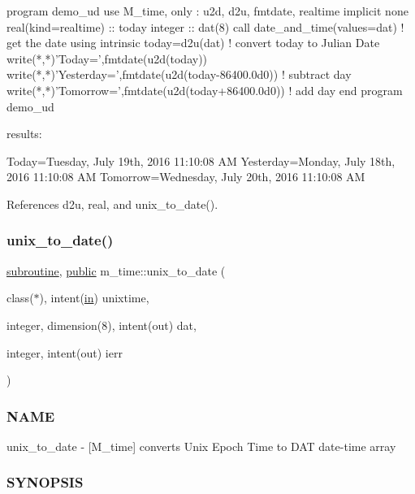 \begin{DoxyVerb}
\begin{DoxyVerb}
 program demo_ud
 use M_time, only : u2d, d2u, fmtdate, realtime
 implicit none
 real(kind=realtime) :: today
 integer :: dat(8)
    call date_and_time(values=dat) ! get the date using intrinsic
    today=d2u(dat)                 ! convert today to Julian Date
    write(*,*)'Today=',fmtdate(u2d(today))
    write(*,*)'Yesterday=',fmtdate(u2d(today-86400.0d0)) ! subtract day
    write(*,*)'Tomorrow=',fmtdate(u2d(today+86400.0d0))  ! add day
 end program demo_ud

results:

 Today=Tuesday, July 19th, 2016 11:10:08 AM
 Yesterday=Monday, July 18th, 2016 11:10:08 AM
 Tomorrow=Wednesday, July 20th, 2016 11:10:08 AM \end{DoxyVerb}
 

References d2u, real, and unix\+\_\+to\+\_\+date().

\mbox{\label{namespacem__time_acc62ada23f8fa2fe67b428702fbcbf1c}} 
\subsubsection{\texorpdfstring{unix\+\_\+to\+\_\+date()}{unix\_to\_date()}}
{\footnotesize\ttfamily \hyperlink{M__stopwatch_83_8txt_acfbcff50169d691ff02d4a123ed70482}{subroutine}, \hyperlink{M__stopwatch_83_8txt_a2f74811300c361e53b430611a7d1769f}{public} m\+\_\+time\+::unix\+\_\+to\+\_\+date (\begin{DoxyParamCaption}\item[{class($\ast$), intent(\hyperlink{M__journal_83_8txt_afce72651d1eed785a2132bee863b2f38}{in})}]{unixtime,  }\item[{integer, dimension(8), intent(out)}]{dat,  }\item[{integer, intent(out)}]{ierr }\end{DoxyParamCaption})}



\subsubsection*{N\+A\+ME}

unix\+\_\+to\+\_\+date -\/ \mbox{[}M\+\_\+time\mbox{]} converts Unix Epoch Time to D\+AT date-\/time array 

\subsubsection*{S\+Y\+N\+O\+P\+S\+IS}


\end{DoxyVerb}
